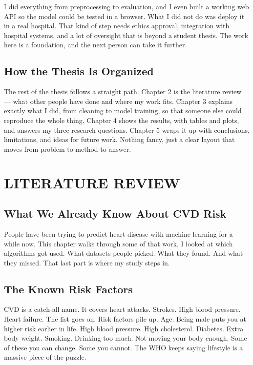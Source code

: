 \documentclass[12pt, a4paper, oneside]{book}
\begin{document}
I did everything from preprocessing to evaluation, and I even built a working web API so the model could be tested in a browser. What I did not do was deploy it in a real hospital. That kind of step needs ethics approval, integration with hospital systems, and a lot of oversight that is beyond a student thesis. The work here is a foundation, and the next person can take it further.

\section{How the Thesis Is Organized}
The rest of the thesis follows a straight path. Chapter 2 is the literature review — what other people have done and where my work fits. Chapter 3 explains exactly what I did, from cleaning to model training, so that someone else could reproduce the whole thing. Chapter 4 shows the results, with tables and plots, and answers my three research questions. Chapter 5 wraps it up with conclusions, limitations, and ideas for future work. Nothing fancy, just a clear layout that moves from problem to method to answer.

\chapter{LITERATURE REVIEW}

\section{What We Already Know About CVD Risk}
People have been trying to predict heart disease with machine learning for a while now. This chapter walks through some of that work. I looked at which algorithms got used. What datasets people picked. What they found. And what they missed. That last part is where my study steps in.

\section{The Known Risk Factors}
CVD is a catch-all name. It covers heart attacks. Strokes. High blood pressure. Heart failure. The list goes on. Risk factors pile up. Age. Being male puts you at higher risk earlier in life. High blood pressure. High cholesterol. Diabetes. Extra body weight. Smoking. Drinking too much. Not moving your body enough. Some of these you can change. Some you cannot. The WHO keeps saying lifestyle is a massive piece of the puzzle.
\end{document}
